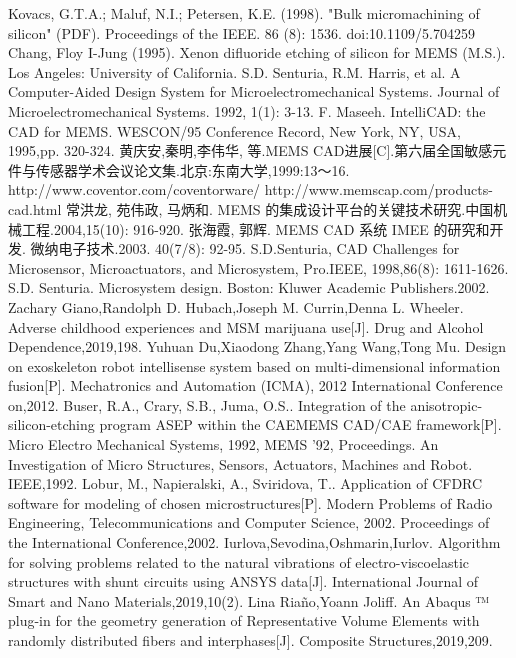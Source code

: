 \documentclass[no-math]{YangThesis}
\begin{document}
\begin{thebibliography}{9}
  Kovacs, G.T.A.; Maluf, N.I.; Petersen, K.E. (1998). "Bulk micromachining of silicon" (PDF). Proceedings of the IEEE. 86 (8): 1536. doi:10.1109/5.704259
  Chang, Floy I-Jung (1995). Xenon difluoride etching of silicon for MEMS (M.S.). Los Angeles: University of California.
  S.D. Senturia, R.M. Harris, et al. A Computer-Aided Design System for Microelectromechanical Systems. Journal of Microelectromechanical Systems. 1992, 1(1): 3-13.
  F. Maseeh. IntelliCAD: the CAD for MEMS. WESCON/95 Conference Record, New York, NY, USA, 1995,pp. 320-324.
  黄庆安,秦明,李伟华, 等.MEMS CAD进展[C].第六届全国敏感元件与传感器学术会议论文集.北京:东南大学,1999:13～16.
  http://www.coventor.com/coventorware/
  http://www.memscap.com/products-cad.html
  常洪龙, 苑伟政, 马炳和. MEMS 的集成设计平台的关键技术研究.中国机械工程.2004,15(10): 916-920.
  张海霞, 郭辉. MEMS CAD 系统 IMEE 的研究和开发. 微纳电子技术.2003. 40(7/8): 92-95.
  S.D.Senturia, CAD Challenges for Microsensor, Microactuators, and Microsystem, Pro.IEEE, 1998,86(8): 1611-1626.
  S.D. Senturia. Microsystem design. Boston: Kluwer Academic Publishers.2002.
  Zachary Giano,Randolph D. Hubach,Joseph M. Currin,Denna L. Wheeler. Adverse childhood experiences and MSM marijuana use[J]. Drug and Alcohol Dependence,2019,198.
  Yuhuan Du,Xiaodong Zhang,Yang Wang,Tong Mu. Design on exoskeleton robot intellisense system based on multi-dimensional information fusion[P]. Mechatronics and Automation (ICMA), 2012 International Conference on,2012.
  Buser, R.A., Crary, S.B., Juma, O.S.. Integration of the anisotropic-silicon-etching program ASEP within the CAEMEMS CAD/CAE framework[P]. Micro Electro Mechanical Systems, 1992, MEMS '92, Proceedings. An Investigation of Micro Structures, Sensors, Actuators, Machines and Robot. IEEE,1992.
  Lobur, M., Napieralski, A., Sviridova, T.. Application of CFDRC software for modeling of chosen microstructures[P]. Modern Problems of Radio Engineering, Telecommunications and Computer Science, 2002. Proceedings of the International Conference,2002.
  Iurlova,Sevodina,Oshmarin,Iurlov. Algorithm for solving problems related to the natural vibrations of electro-viscoelastic structures with shunt circuits using ANSYS data[J]. International Journal of Smart and Nano Materials,2019,10(2).
  Lina Riaño,Yoann Joliff. An Abaqus ™ plug-in for the geometry generation of Representative Volume Elements with randomly distributed fibers and interphases[J]. Composite Structures,2019,209.

\end{thebibliography}
\end{document}
